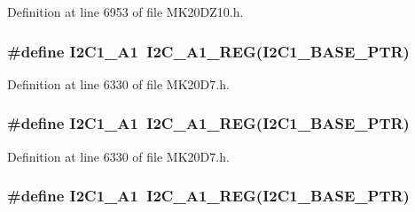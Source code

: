 Definition at line 6953 of file M\+K20\+D\+Z10.\+h.

\subsubsection[{\texorpdfstring{I2\+C1\+\_\+\+A1}{I2C1_A1}}]{\setlength{\rightskip}{0pt plus 5cm}\#define I2\+C1\+\_\+\+A1~{\bf I2\+C\+\_\+\+A1\+\_\+\+R\+EG}({\bf I2\+C1\+\_\+\+B\+A\+S\+E\+\_\+\+P\+TR})}\hypertarget{group___i2_c___register___accessor___macros_ga1488ec8f3fd718170359dfc0045ee8e1}{}\label{group___i2_c___register___accessor___macros_ga1488ec8f3fd718170359dfc0045ee8e1}


Definition at line 6330 of file M\+K20\+D7.\+h.

\subsubsection[{\texorpdfstring{I2\+C1\+\_\+\+A1}{I2C1_A1}}]{\setlength{\rightskip}{0pt plus 5cm}\#define I2\+C1\+\_\+\+A1~{\bf I2\+C\+\_\+\+A1\+\_\+\+R\+EG}({\bf I2\+C1\+\_\+\+B\+A\+S\+E\+\_\+\+P\+TR})}\hypertarget{group___i2_c___register___accessor___macros_ga1488ec8f3fd718170359dfc0045ee8e1}{}\label{group___i2_c___register___accessor___macros_ga1488ec8f3fd718170359dfc0045ee8e1}


Definition at line 6330 of file M\+K20\+D7.\+h.

\subsubsection[{\texorpdfstring{I2\+C1\+\_\+\+A1}{I2C1_A1}}]{\setlength{\rightskip}{0pt plus 5cm}\#define I2\+C1\+\_\+\+A1~{\bf I2\+C\+\_\+\+A1\+\_\+\+R\+EG}({\bf I2\+C1\+\_\+\+B\+A\+S\+E\+\_\+\+P\+TR})}\hypertarget{group___i2_c___register___accessor___macros_ga1488ec8f3fd718170359dfc0045ee8e1}{}\label{group___i2_c___register___accessor___macros_ga1488ec8f3fd718170359dfc0045ee8e1}


